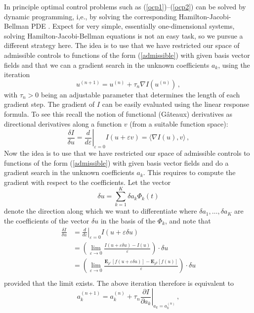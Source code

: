 \documentclass[]{tMPH2e}
\newcommand{\eps}{\varepsilon}
\newcommand{\bE}{{\mathbf E}}
\newcommand{\wrt}{with respect to }
\begin{document}
In principle optimal control problems such as (\ref{ocp1})--(\ref{ocp2}) can be solved by dynamic programming, i,e., by solving the corresponding Hamilton-Jacobi-Bellman PDE \cite{fleming2006}. Expect for very simple, essentially one-dimensional systems, solving Hamilton-Jacobi-Bellman equations is not an easy task, so we pursue a different strategy here. The idea is to use that we have restricted our space of admissible controls to functions of the form (\ref{admissible}) with given basis vector fields and that we can a gradient search in the unknown coefficients $a_{k}$, using the iteration
\[
u^{(n+1)} = u^{(n)} + \tau_{n}\nabla I(u^{(n)})\,,
\]
with $\tau_{n}>0$ being an adjustable parameter that determines the length of each gradient step. The gradient of $I$ can be easily evaluated using the linear response formula. To see this recall the notion of functional (G\^ateaux) derivatives as directional derivatives along a function $v$ (from a suitable function space): 
\begin{equation*}
\frac{\delta I}{\delta u} = \left.\frac{d}{d\eps}\right|_{\eps=0} I(u+\eps v) = \langle\nabla I(u),v\rangle\,,
\end{equation*} 
Now the idea is to use that we have restricted our space of admissible controls to functions of the form (\ref{admissible}) with given basis vector fields and do a gradient search in the unknown coefficients $a_{k}$. This requires to compute the gradient \wrt the coefficients. Let the vector  
\[
\delta u = \sum_{k=1}^K \delta a_k \Phi_k(t)
\]   
denote the direction along which we want to differentiate where $\delta a_{1},\ldots,\delta a_{K}$ are the coefficients of the vector $\delta u$ in the basis of the $\Phi_{k}$, and note that 
\begin{equation*}
\begin{aligned}
\frac{\delta I}{\delta u} & = \left.\frac{d}{d\eps}\right|_{\eps=0} I(u+\eps \delta u)\\
& = \left(\lim_{\eps\to 0}\frac{I(u+\eps\delta u) - I(u)}{\eps}\right)\cdot \delta u\\
& = \left(\lim_{\eps\to 0}\frac{\bE_{\rho^{\eps}}[f(u+\eps \delta u)] - \bE_{\rho^{0}}[f(u)]}{\eps}\right)\cdot\delta u\\
\end{aligned}
\end{equation*} 
provided that the limit exists. The above iteration therefore is equivalent to
\begin{equation}\label{gd}
a_{k}^{(n+1)} = a_{k}^{(n)} + \tau_{n}\left.\frac{\partial I}{\partial a_{k}}\right|_{a_{k}=a_{k}^{(n)}}\,,
\end{equation}
\end{document}
